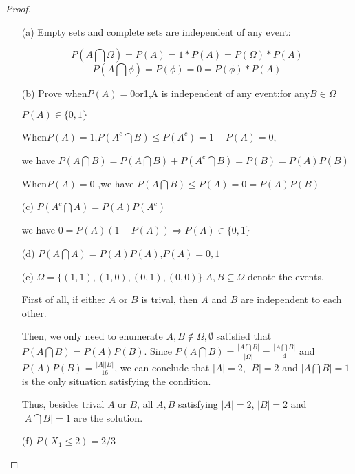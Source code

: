 \begin{proof}
\begin{enumerate}
    \item[(a)]Empty sets and complete sets are independent of any event:

$$P(A\bigcap\Omega)=P(A)=1*P(A)=P(\Omega)*P(A)$$
$$P(A\bigcap\phi)=P(\phi)=0=P(\phi)*P(A)$$

\item[(b)]Prove when$P(A)=0$or1,A is independent of any event:for any$B\in\Omega$

$P(A)\in\{0,1\}$

When$P(A)=1$,$P(A^c \bigcap B)\leq P(A^c) = 1-P(A) =0$,

we have $P(A \bigcap B) = P(A \bigcap B) + P(A^c \bigcap B) = P(B) = P(A)P(B)$

When$P(A)=0$ ,we have $P(A \bigcap B)\leq P(A) =0=P(A)P(B)$

\item[(c)]$P(A^c \bigcap A) = P(A)P(A^c)$

we have $0=P(A)(1-P(A))\Rightarrow P(A)\in\{0,1\}$

\item[(d)]$P(A \bigcap A) = P(A)P(A)$,$P(A)=0,1$

\item[(e)]$\Omega=\{(1,1),(1,0),(0,1),(0,0)\}. A,B \subseteq \Omega$ denote the events.
  
First of all, if either $A$ or $B$ is trival, then $A$ and $B$ are independent to each other. 

Then, we only need to enumerate $A,B\notin {\Omega, \emptyset}$ satisfied that $P(A\bigcap B) = P(A)P(B)$. 
Since $P(A\bigcap B) = \frac{|A\bigcap B|}{|\Omega|} = \frac{|A \bigcap B|}{4}$ and $P(A)P(B) = \frac{|A||B|}{16}$, we can conclude that $|A| = 2$, $|B| = 2$ and $|A\bigcap B| = 1$ is the only situation satisfying the condition. 

Thus, besides trival $A$ or $B$, all $A, B$ satisfying $|A| = 2$, $|B| = 2$ and $|A\bigcap B| = 1$ are the solution. 

\iffalse
Just verify that each case is independent :$P(A=1,B=1)=\frac{1}{4}=\frac{1}{2} *\frac{1}{2}=P(A)P(B)$

$P(A=1,B=0)=\frac{1}{4}=\frac{1}{2} *\frac{1}{2}=P(A)P(B)$

$P(A=0,B=1)=\frac{1}{4}=\frac{1}{2} *\frac{1}{2}=P(A)P(B)$

$P(A=0,B=0)=\frac{1}{4}=\frac{1}{2} *\frac{1}{2}=P(A)P(B)$
\fi

\item[(f)]$P(X_1 \leq 2)=2/3$


\end{enumerate}
\end{proof}
